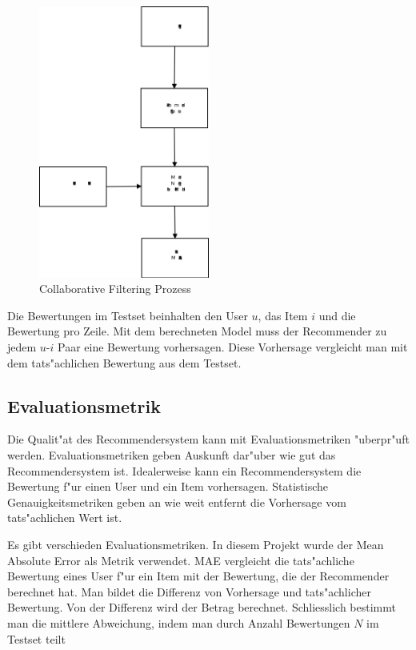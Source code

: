 \documentclass[a4paper, 12pt]{article}
\begin{document}
\begin{figure}
  \centering
      \includegraphics[width=0.5\textwidth]{evaluation}
  \caption{Collaborative Filtering Prozess}
\end{figure}

Die Bewertungen im Testset beinhalten den User $u$, das Item $i$ und die Bewertung pro Zeile. Mit dem berechneten Model muss der Recommender zu jedem $u$-$i$ Paar eine Bewertung vorhersagen. Diese Vorhersage vergleicht man mit dem tats"achlichen Bewertung aus dem Testset.

\subsection{Evaluationsmetrik}
\label{sec:evaluationmetrik}

Die Qualit"at des Recommendersystem kann mit Evaluationsmetriken "uberpr"uft werden. Evaluationsmetriken geben Auskunft dar"uber wie gut das Recommendersystem ist. Idealerweise kann ein Recommendersystem die Bewertung f"ur einen User und ein Item vorhersagen. Statistische Genauigkeitsmetriken geben an wie weit entfernt die Vorhersage vom tats"achlichen Wert ist. 

Es gibt verschieden Evaluationsmetriken. In diesem Projekt wurde der Mean Absolute Error als Metrik verwendet. MAE vergleicht die tats"achliche Bewertung eines User f"ur ein Item mit der Bewertung, die der Recommender berechnet hat. Man bildet die Differenz von Vorhersage und tats"achlicher Bewertung. Von der Differenz wird der Betrag berechnet. Schliesslich bestimmt man die mittlere Abweichung, indem man durch Anzahl Bewertungen $N$ im Testset teilt 
\end{document}
